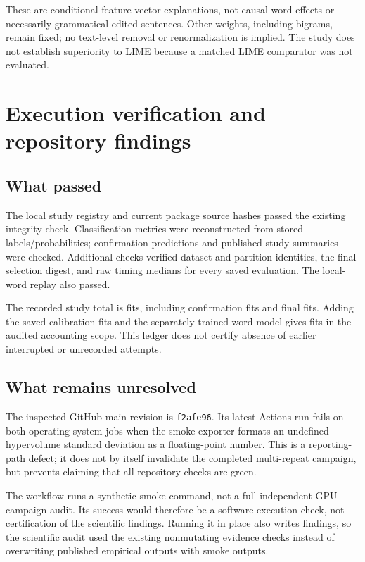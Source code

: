 \documentclass[12pt,a4paper]{article}
\begin{document}
These are conditional feature-vector explanations, not causal word effects or necessarily grammatical edited sentences. Other weights, including bigrams, remain fixed; no text-level removal or renormalization is implied. The study does not establish superiority to LIME because a matched LIME comparator was not evaluated.

\section{Execution verification and repository findings}
\subsection{What passed}
The local study registry and current package source hashes passed the existing integrity check. Classification metrics were reconstructed from stored labels/probabilities; confirmation predictions and published study summaries were checked. Additional checks verified dataset and partition identities, the final-selection digest, and raw timing medians for every saved evaluation. The local-word replay also passed.

The recorded study total is \StudyFits{} fits, including \ConfirmFits{} confirmation fits and \FinalFits{} final fits. Adding the saved calibration fits and the separately trained word model gives \AllFits{} fits in the audited accounting scope. This ledger does not certify absence of earlier interrupted or unrecorded attempts.

\subsection{What remains unresolved}
The inspected GitHub main revision is \texttt{f2afe96}. Its latest Actions run fails on both operating-system jobs when the smoke exporter formats an undefined hypervolume standard deviation as a floating-point number. This is a reporting-path defect; it does not by itself invalidate the completed multi-repeat campaign, but prevents claiming that all repository checks are green.

The workflow runs a synthetic smoke command, not a full independent GPU-campaign audit. Its success would therefore be a software execution check, not certification of the scientific findings. Running it in place also writes findings, so the scientific audit used the existing nonmutating evidence checks instead of overwriting published empirical outputs with smoke outputs.
\end{document}
